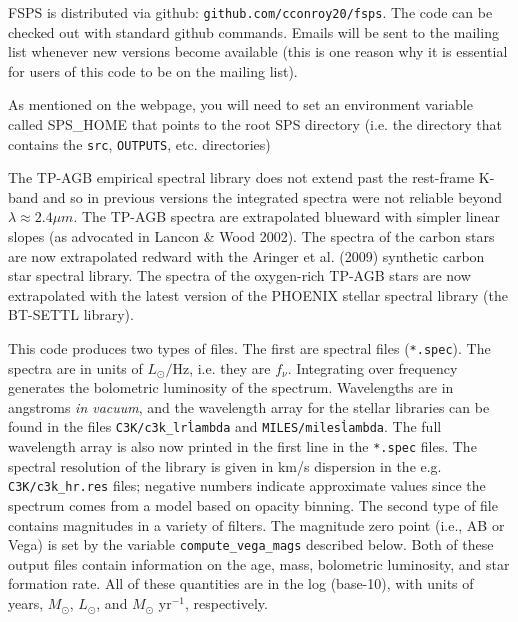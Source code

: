\documentclass[]{article}
\begin{document}
\noindent
FSPS is distributed via github: \texttt{github.com/cconroy20/fsps}.  The code
can be checked out with standard github commands.  Emails will be sent to the
mailing list whenever new versions become available (this is one reason why it
is essential for users of this code to be on the mailing list).

\vspace{0.1in}
\vspace{0.1in}

\noindent
As mentioned on the webpage, you will need to set an environment variable called
SPS\_HOME that points to the root SPS directory (i.e. the directory that
contains the \texttt{src}, \texttt{OUTPUTS}, etc. directories)

\vspace{0.1in}
\vspace{0.1in}

\noindent
The TP-AGB empirical spectral library does not extend past the rest-frame K-band
and so in previous versions the integrated spectra were not reliable beyond
$\lambda\approx2.4\mu m$.  The TP-AGB spectra are extrapolated blueward with
simpler linear slopes (as advocated in Lancon \& Wood 2002).  The spectra of the
carbon stars are now extrapolated redward with the Aringer et al. (2009)
synthetic carbon star spectral library.  The spectra of the oxygen-rich TP-AGB
stars are now extrapolated with the latest version of the PHOENIX stellar
spectral library (the BT-SETTL library).

\vspace{0.1in}
\vspace{0.1in}

\noindent
This code produces two types of files.  The first are spectral files
(\texttt{*.spec}). The spectra are in units of $L_{\odot}/$Hz, i.e. they are
$f_\nu$.  Integrating over frequency generates the bolometric luminosity of the
spectrum.  Wavelengths are in angstroms {\it in vacuum}, and the wavelength
array for the stellar libraries can be found in the files
\texttt{C3K/c3k\_lr\.lambda} and \texttt{MILES/miles\.lambda}.  The full
wavelength array is also now printed in the first line in the \texttt{*.spec}
files.  The spectral resolution of the library is given in km/s dispersion in
the e.g. \texttt{C3K/c3k\_hr.res} files; negative numbers indicate approximate
values since the spectrum comes from a model based on opacity binning. The
second type of file contains magnitudes in a variety of filters.  The magnitude
zero point (i.e., AB or Vega) is set by the variable
\texttt{compute\_vega\_mags} described below.  Both of these output files
contain information on the age, mass, bolometric luminosity, and star formation
rate.  All of these quantities are in the log (base-10), with units of years,
$M_\odot$, $L_\odot$, and $M_\odot$ yr$^{-1}$, respectively.
\end{document}
